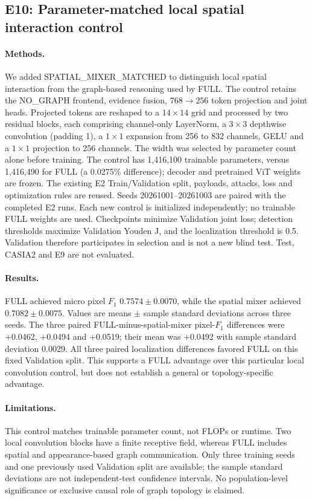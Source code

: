 \subsection{E10: Parameter-matched local spatial interaction control}
\paragraph{Methods.}
We added SPATIAL\_MIXER\_MATCHED to distinguish local spatial interaction
from the graph-based reasoning used by FULL. The control retains the
NO\_GRAPH frontend, evidence fusion, $768\to256$ token projection and
joint heads. Projected tokens are reshaped to a $14\times14$ grid and
processed by two residual blocks, each comprising channel-only LayerNorm,
a $3\times3$ depthwise convolution (padding 1), a $1\times1$ expansion
from 256 to 832 channels, GELU and a $1\times1$ projection to 256 channels.
The width was selected by parameter count alone before training.
The control has 1,416,100 trainable parameters, versus 1,416,490 for FULL
(a 0.0275\% difference); decoder and pretrained ViT weights are frozen.
The existing E2 Train/Validation split, payloads, attacks, loss and
optimization rules are reused. Seeds 20261001--20261003 are paired with
the completed E2 runs. Each new control is initialized independently;
no trainable FULL weights are used. Checkpoints minimize Validation
joint loss; detection thresholds maximize Validation Youden J, and
the localization threshold is 0.5. Validation therefore participates
in selection and is not a new blind test. Test, CASIA2 and E9 are not evaluated.

\paragraph{Results.}
FULL achieved micro pixel $F_1$ $0.7574\pm0.0070$, while the spatial mixer achieved $0.7082\pm0.0075$. Values are means $\pm$ sample standard deviations across three seeds. The three paired FULL-minus-spatial-mixer pixel-$F_1$ differences were +0.0462, +0.0494 and +0.0519; their mean was +0.0492 with sample standard deviation 0.0029. All three paired localization differences favored FULL on this fixed Validation split. This supports a FULL advantage over this particular local convolution control, but does not establish a general or topology-specific advantage.

\paragraph{Limitations.}
This control matches trainable parameter count, not FLOPs or runtime.
Two local convolution blocks have a finite receptive field, whereas
FULL includes spatial and appearance-based graph communication.
Only three training seeds and one previously used Validation split
are available; the sample standard deviations are not independent-test
confidence intervals. No population-level significance or exclusive
causal role of graph topology is claimed.


